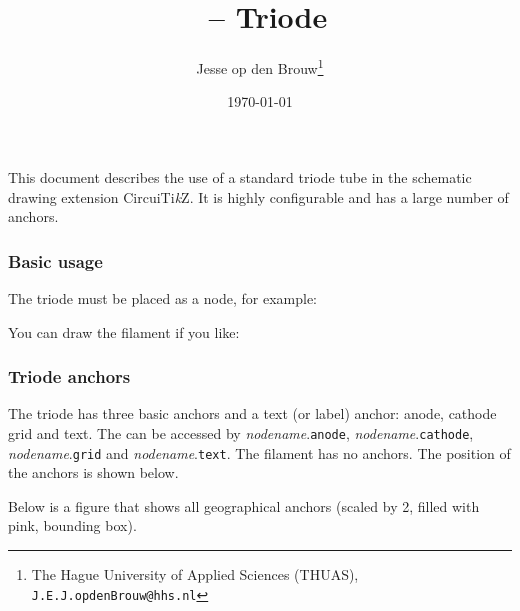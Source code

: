 \documentclass[a4paper,titlepage]{article}
\author{Jesse op den Brouw\thanks{The Hague University of Applied Sciences (THUAS), \texttt{J.E.J.opdenBrouw@hhs.nl}}}
\title{\Circuitikz\ -- Triode}
\date{\today}
\def\Circuitikz{CircuiTi\emph{k}Z}
\begin{document}
This document describes the use of a standard triode tube in the schematic drawing extension \Circuitikz. It is highly configurable and has a large number of anchors.

\subsubsection*{Basic usage}

The triode must be placed as a node, for example:

\begin{LTXexample}[varwidth]
\end{LTXexample}

You can draw the filament if you like:

\begin{LTXexample}[varwidth]
\end{LTXexample}

\subsubsection*{Triode anchors}

The triode has three basic anchors and a text (or label) anchor: anode, cathode grid and text. The can be accessed by \emph{nodename}.\texttt{anode}, \emph{nodename}.\texttt{cathode}, \emph{nodename}.\texttt{grid} and \emph{nodename}.\texttt{text}. The filament has no anchors. The position of the anchors is shown below.

\begin{LTXexample}[varwidth]
\end{LTXexample}

Below is a figure that shows all geographical anchors (scaled by 2, filled with pink, bounding box).

\end{document}
